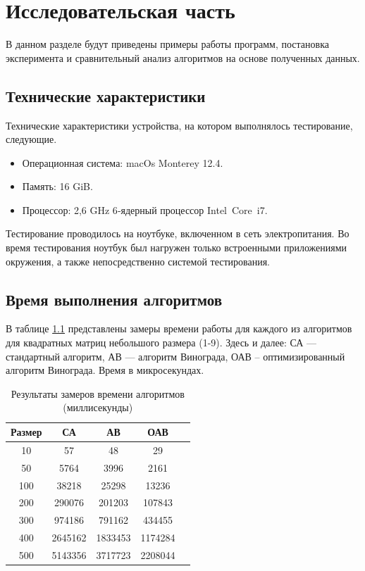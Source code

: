 \chapter{Исследовательская часть}

В данном разделе будут приведены примеры работы программ,
постановка эксперимента и сравнительный анализ алгоритмов на основе
полученных данных.

\section{Технические характеристики}

Технические характеристики устройства, на котором выполнялось тестирование,
следующие.

\begin{itemize}
	\item Операционная система: macOs Monterey 12.4\cite{ubuntu}.
	\item Память: 16 GiB.
	\item Процессор: 2,6 GHz 6‑ядерный процессор Intel Core i7\cite{intel}.
\end{itemize}

Тестирование проводилось на ноутбуке, включенном в сеть электропитания.
Во время тестирования ноутбук был нагружен только встроенными приложениями
окружения, а также непосредственно системой тестирования.


\section{Время выполнения алгоритмов}

В таблице \ref{tab:time0} представлены замеры времени работы для каждого из алгоритмов для квадратных матриц небольшого размера (1-9). Здесь и далее: СА — стандартный алгоритм, АВ — алгоритм Винограда, ОАВ -- оптимизированный алгоритм Винограда. Время в микросекундах.

\begin{table}[h]
	\begin{center}
		\captionsetup{justification=raggedright,singlelinecheck=off}
		\caption{\label{tab:time0}Результаты замеров времени алгоритмов (миллисекунды)}
		\begin{tabular}{|c|c|c|c|c|}
		\hline
		Размер & СА &  АВ & ОАВ \\
		\hline
		10  & 57 & 48 & 29\\
		\hline
		50  & 5764 & 3996 & 2161\\
		\hline
		100  & 38218 & 25298 & 13236 \\
		\hline
		200  & 290076 & 201203 & 107843 \\
		\hline
		300  & 974186 & 791162 & 434455 \\
		\hline
		400  & 2645162 & 1833453 & 1174284 \\
		\hline
		500  & 5143356 & 3717723 & 2208044 \\
		\hline
		\end{tabular}
	\end{center}
\end{table}

